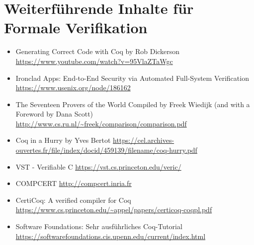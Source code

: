 \section{Weiterführende Inhalte für Formale Verifikation}
\label{a:append}

\begin{itemize}
	\item Generating Correct Code with Coq by Rob Dickerson \url{https://www.youtube.com/watch?v=95VlaZTaWgc}
	\item Ironclad Apps: End-to-End Security via Automated Full-System Verification \url{https://www.usenix.org/node/186162}
	\item The Seventeen Provers of the World Compiled by Freek Wiedijk
	(and with a Foreword by Dana Scott)
	\url{http://www.cs.ru.nl/~freek/comparison/comparison.pdf}
	\item Coq in a Hurry by Yves Bertot \url{https://cel.archives-ouvertes.fr/file/index/docid/459139/filename/coq-hurry.pdf}
	\item VST - Verifiable C \url{https://vst.cs.princeton.edu/veric/}
	\item COMPCERT \url{http://compcert.inria.fr}
	\item CertiCoq: A verified compiler for Coq
	\url{https://www.cs.princeton.edu/~appel/papers/certicoq-coqpl.pdf}
	\item Software Foundations: Sehr ausführliches Coq-Tutorial \url{https://softwarefoundations.cis.upenn.edu/current/index.html}
\end{itemize} 

